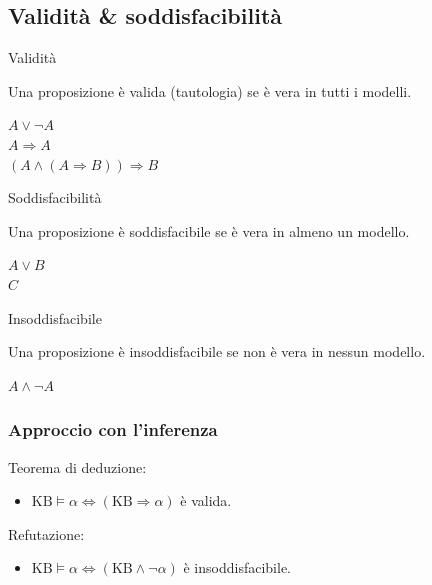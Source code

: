 \documentclass[11pt, a4paper]{article}
\newcommand{\KB}{\mathrm{KB}}
\begin{document}
\subsection{Validità \& soddisfacibilità}

\begin{tcbraster}[raster columns=3, raster equal height, raster column skip=10pt, raster before skip=8pt, raster after skip=10pt]
  \begin{defbox}{Validità}
    \raggedright
    Una proposizione è valida (tautologia) se è vera in tutti i modelli.
    \begin{esempio}
      $A \lor \lnot A$ \\
      $A \Rightarrow A$ \\
      $(A \land (A \Rightarrow B)) \Rightarrow B$
    \end{esempio}
  \end{defbox}
  \begin{defbox}{Soddisfacibilità}
    \raggedright
    Una proposizione è soddisfacibile se è vera in almeno un modello.
    \begin{esempio}
      $A \lor B$ \\
      $C$
    \end{esempio}
  \end{defbox}
  \begin{defbox}{Insoddisfacibile}
    \raggedright
    Una proposizione è insoddisfacibile se non è vera in nessun modello.
    \begin{esempio}
      $A \land \lnot A$
    \end{esempio}
  \end{defbox}
\end{tcbraster}

\subsubsection*{Approccio con l'inferenza}

  Teorema di deduzione:

  \begin{itemize}
    \item   $\KB \models \alpha \iff (\KB \Rightarrow \alpha)$ è valida.
  \end{itemize}
  Refutazione:
  \begin{itemize}
    \item $\KB \models \alpha \iff (\KB \land \lnot\alpha)$ è insoddisfacibile.
  \end{itemize}
\end{document}
